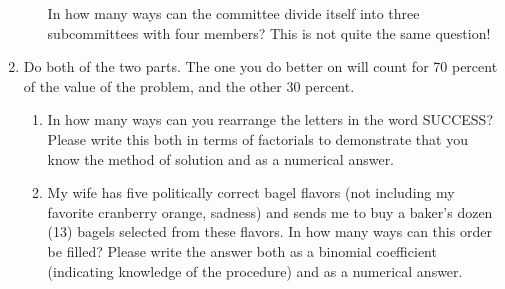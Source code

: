 \documentclass[12pt]{article}
\begin{document}
\begin{enumerate}
\begin{enumerate}
In how many ways can the committee divide itself into three subcommittees with four members?  This is not quite the same question!


\end{enumerate}



\newpage

\item  Do both of the two parts.  The one you do better on will count for 70 percent of the value of the problem,
and the other 30 percent.

\begin{enumerate}

\item  In how many ways can you rearrange the letters in the word \newline SUCCESS?  Please write this both in terms of factorials to demonstrate that you know the method of solution and as a numerical answer.

\newpage

\item  My wife has five politically correct bagel flavors (not including my favorite cranberry orange, sadness) and sends me
to buy a baker's dozen (13) bagels selected from these flavors.  In how many ways can this order be filled?  Please write the answer both as a binomial coefficient (indicating knowledge of the procedure) and as a numerical answer.

\end{enumerate}

\newpage

\end{enumerate}
\end{document}
